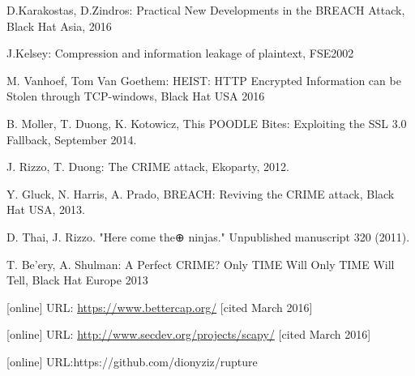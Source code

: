 \documentclass[a4paper, 11 pt, conference]{article}
\begin{document}
\begin{thebibliography}{14}

  D.Karakostas, D.Zindros: Practical New Developments in the BREACH Attack, Black Hat Asia, 2016

 J.Kelsey: Compression and information leakage of plaintext, FSE2002

 M. Vanhoef, Tom Van Goethem: HEIST: HTTP Encrypted Information can be
Stolen through TCP-windows, Black Hat USA 2016

 B. Moller, T. Duong, K. Kotowicz, This POODLE Bites: Exploiting the SSL 3.0 Fallback, September 2014.

 J. Rizzo, T. Duong: The CRIME attack, Ekoparty, 2012.

 Y. Gluck, N. Harris, A. Prado, BREACH: Reviving the CRIME attack,
Black Hat USA, 2013.

 D. Thai, J. Rizzo. "Here come the⊕ ninjas." Unpublished manuscript 320 (2011).

T. Be'ery, A. Shulman: A Perfect CRIME? Only TIME Will Only TIME Will Tell, Black Hat Europe 2013

 [online] URL: \url{https://www.bettercap.org/} [cited March 2016]

 [online] URL: \url{http://www.secdev.org/projects/scapy/} [cited March 2016]

 [online] URL:https://github.com/dionyziz/rupture

\end{thebibliography}
\end{document}
